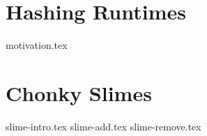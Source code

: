 \documentclass[11pt]{exam}
\begin{document}

\pagebreak
\section{Hashing Runtimes}
\begin{questions}
{motivation.tex}
\end{questions}



\pagebreak
\section{Chonky Slimes}
\begin{questions}
{slime-intro.tex}
{slime-add.tex}
{slime-remove.tex}
\end{questions}
\end{document}
